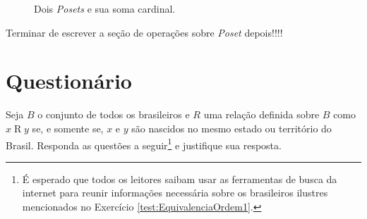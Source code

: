 \begin{figure}[h]
  \centering
  \quad\quad\quad  
  \caption{Dois \textit{Posets} e sua soma cardinal.}
  \label{fig:PosetsParaSomaCardinal1}
\end{figure}


{\color{red} Terminar de escrever a seção de operações sobre \textit{Poset} depois!!!!}

\section{Questionário}\label{sec:Questionario4part1}

\begin{questao}\label{test:EquivalenciaOrdem1}
	Seja $B$ o conjunto de todos os brasileiros e $R$ uma relação definida sobre $B$ como $x \mathrel{R} y$ se, e somente se, $x$ e $y$ são nascidos no mesmo estado ou território do Brasil. Responda as questões a seguir\footnote{É esperado que todos os leitores saibam usar as ferramentas de busca da internet para reunir informações necessária sobre os brasileiros ilustres mencionados no Exercício \ref{test:EquivalenciaOrdem1}.} e justifique sua resposta.
\end{questao}

